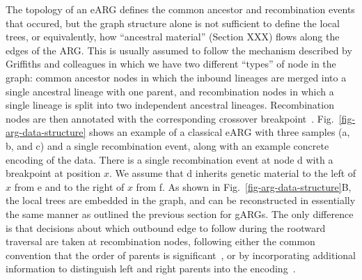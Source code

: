 \documentclass{article}
\newcommand{\noderef}[1]{\textsf{#1}}
\begin{document}
The topology of an eARG defines the common ancestor and
recombination events that occured,
but the graph structure alone is not sufficient to define the local trees,
or equivalently, how ``ancestral material'' (Section XXX) flows along
the edges of the ARG.
This is usually assumed to follow the mechanism described by
Griffiths and colleagues in which we have
two different ``types'' of node in the graph:
common ancestor nodes in which the inbound lineages are merged into a
single ancestral lineage with one parent, and recombination
nodes in which a single lineage is split into two independent
ancestral lineages.
Recombination nodes are then
annotated with
the corresponding crossover breakpoint~\citep{griffiths1996ancestral}.
Fig.~\ref{fig-arg-data-structure} shows an example of a classical
eARG with three samples (\noderef{a}, \noderef{b}, and \noderef{c})
and a single recombination event, along with an example concrete
encoding of the data.  There is a single recombination event
at node \noderef{d} with a breakpoint at position $x$. We
assume that \noderef{d} inherits genetic material to the
left of $x$ from \noderef{e} and to the right of $x$ from \noderef{f}.
As shown in Fig.~\ref{fig-arg-data-structure}B,
the local trees are embedded in the graph, and can be reconstructed
in essentially the same manner as outlined the previous section for
gARGs. The only difference is that decisions about which outbound
edge to follow during the rootward traversal are taken at recombination
nodes, following
either the common convention that the order of parents
is significant~\citep[e.g.][]{griffiths1991two},
or by incorporating additional information to
distinguish left and right parents
into the
encoding~\citep[e.g.][]{gusfield2014recombinatorics,ignatieva2021kwarg}.
\end{document}
